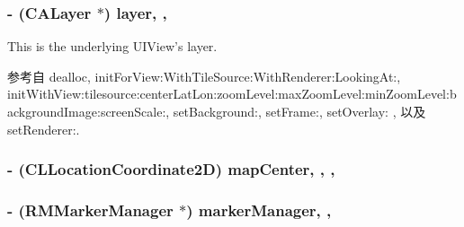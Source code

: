 \hypertarget{interface_r_m_map_contents_afba5a8749837d703d4c551c12e134c54}{
\subsubsection[{layer}]{\setlength{\rightskip}{0pt plus 5cm}-\/ (C\-A\-Layer $\ast$) layer\hspace{0.3cm}{\ttfamily [read]}, {\ttfamily [atomic]}, {\ttfamily [assign]}}}\label{interface_r_m_map_contents_afba5a8749837d703d4c551c12e134c54}


This is the underlying U\-I\-View's layer. 



参考自 dealloc, init\-For\-View\-:\-With\-Tile\-Source\-:\-With\-Renderer\-:\-Looking\-At\-:, init\-With\-View\-:tilesource\-:center\-Lat\-Lon\-:zoom\-Level\-:max\-Zoom\-Level\-:min\-Zoom\-Level\-:background\-Image\-:screen\-Scale\-:, set\-Background\-:, set\-Frame\-:, set\-Overlay\-: , 以及 set\-Renderer\-:.

\hypertarget{interface_r_m_map_contents_a66dc32c1210bd62ef66dd729aebcf55c}{
\subsubsection[{map\-Center}]{\setlength{\rightskip}{0pt plus 5cm}-\/ (C\-L\-Location\-Coordinate2\-D) map\-Center\hspace{0.3cm}{\ttfamily [read]}, {\ttfamily [write]}, {\ttfamily [atomic]}, {\ttfamily [assign]}}}\label{interface_r_m_map_contents_a66dc32c1210bd62ef66dd729aebcf55c}
\hypertarget{interface_r_m_map_contents_a2e28d0b3c7f2670181edb8b87ab0324f}{
\subsubsection[{marker\-Manager}]{\setlength{\rightskip}{0pt plus 5cm}-\/ ({\bf R\-M\-Marker\-Manager} $\ast$) marker\-Manager\hspace{0.3cm}{\ttfamily [read]}, {\ttfamily [atomic]}, {\ttfamily [retain]}}}\label{interface_r_m_map_contents_a2e28d0b3c7f2670181edb8b87ab0324f}


